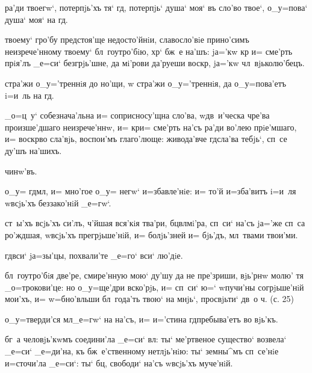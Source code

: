   ра'ди твоегw`, потерпjь'хъ тя` гд, 
потерпjь` душа` моя` въ сло'во твое`, о_у=пова` душа` 
моя` на гд.

 твоему` гро'бу предстоя'ще 
недосто'йнiи, славосло'вiе прино'симъ неизрече'нному 
твоему` бл~гоутро'бiю, хр` бж~е на'шъ: jа='кw кр 
и= сме'рть прiя'лъ _е=си` безгрjь'шне, да мi'рови 
да'руеши воскр, jа='кw чл~вjьколю'бецъ.

 стра'жи о_у='треннiя до но'щи, w\т 
стра'жи о_у='треннiя, да о_у=пова'етъ i=и~ль на гд.

 _о=ц~у` собезнача'льна и= соприсносу'щна 
сло'ва, w\т дв~и'ческа чре'ва произше'дшаго неизрече'ннw, 
и= кр и= сме'рть на'съ ра'ди во'лею прiе'мшаго, и= 
воскр во сла'вjь, воспои'мъ глаго'люще: живода'вче 
гд сла'ва тебjь`, сп~се ду'шъ на'шихъ.


     чинw'въ.

  о_у= гд мл, и= мно'гое о_у= 
негw` и=збавле'нiе: и= то'й и=зба'витъ i=и~ля w\т всjь'хъ 
беззако'нiй _е=гw`.

 ст~ы'хъ всjь'хъ си'лъ, ч'йшая 
вся'кiя тва'ри, бц вл мi'ра, сп~си` на'съ jа='же 
сп~са ро'ждшая, w\т всjь'хъ прегрjьше'нiй, и= болjь'зней 
и= бjь'дъ, мл~твами твои'ми.

  гд вси` jа=зы'цы, похвали'те 
_е=го` вси` лю'дiе.

 бл~гоутро'бiя две'ре, смире'нную мою` ду'шу да 
не пре'зриши, вjь'рнw молю' тя _о=трокови'це: но 
о_у=ще'дри вско'рjь, и= сп~си` ю=` w\т пучи'ны 
согрjьше'нiй мои'хъ, и= w=бно'вльши бл~года'ть твою` на 
мнjь`, просвjьти` дв~о ч. (с. 25)

  о_у=тверди'ся мл _е=гw` на на'съ, 
и= и='стина гд пребыва'етъ во вjь'къ.

 бг~а человjь'кwмъ соедини'ла _е=си` вл: ты` 
ме'ртвеное существо` возвела` _е=си` _е=ди'на, къ 
бж~е'ственному нетлjь'нiю: ты` земны^мъ сп~се'нiе 
и=сточи'ла _е=си`: ты` бц, свободи` на'съ w\т всjь'хъ 
муче'нiй.


